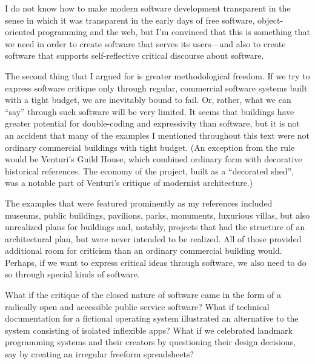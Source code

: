 I do not know how to make modern software development transparent in the sense in which it
was transparent in the early days of free software, object-oriented programming and the
web, but I'm convinced that this is something that we need in order to create software that
serves its users---and also to create software that supports self-reflective
critical discourse about software.

The second thing that I argued for is greater methodological freedom. If we try to express
software critique only through regular, commercial software systems built with a tight budget,
we are inevitably bound to fail. Or, rather, what we can ``say'' through such software
will be very limited. It seems that buildings have greater potential for double-coding and
expressivity than software, but it is not an accident that many of the examples I mentioned
throughout this text were not ordinary commercial buildings with tight budget. (An exception
from the rule would be Venturi's Guild House, which combined ordinary form with decorative
historical references. The economy of the project, built as a ``decorated shed'',
was a notable part of Venturi's critique of modernist architecture.)

The examples that were featured prominently as my references included museums, public buildings,
pavilions, parks, monuments, luxurious villas, but also unrealized plans for buildings
and, notably, projects that had the structure of an architectural plan, but were never
intended to be realized. All of those provided additional room for criticism than an
ordinary commercial building would. Perhaps, if we want to express critical ideas through
software, we also need to do so through special kinds of software.

What if the critique of the closed nature of software came in the form of a radically open
and accessible public service software? What if technical documentation for a fictional
operating system illustrated an alternative to the system consisting of isolated inflexible
apps? What if we celebrated landmark programming systems and their creators by questioning
their design decisions, say by creating an irregular freeform spreadsheets?

\newpage
\theendnotes















































~
